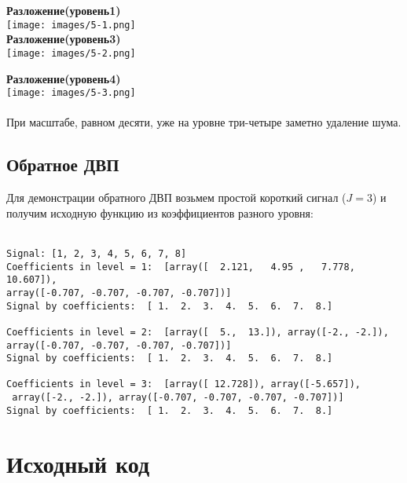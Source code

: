 \documentclass[12pt]{article}
\begin{document}
\textbf{Разложение(уровень1)}\\
\texttt{[image: images/5-1.png]}\\

\textbf{Разложение(уровень3)}\\
\texttt{[image: images/5-2.png]}\\
\newpage

\textbf{Разложение(уровень4)}\\
\texttt{[image: images/5-3.png]}\\
\\
При масштабе, равном десяти, уже на уровне три-четыре заметно удаление шума.

\subsection*{Обратное ДВП}

Для демонстрации обратного ДВП возьмем простой короткий сигнал ($J = 3$) и получим исходную функцию из коэффициентов разного уровня:\\
\\
\begin{lstlisting}
Signal: [1, 2, 3, 4, 5, 6, 7, 8]
Coefficients in level = 1:  [array([  2.121,   4.95 ,   7.778,  10.607]), 
array([-0.707, -0.707, -0.707, -0.707])]
Signal by coefficients:  [ 1.  2.  3.  4.  5.  6.  7.  8.]

Coefficients in level = 2:  [array([  5.,  13.]), array([-2., -2.]), 
array([-0.707, -0.707, -0.707, -0.707])]
Signal by coefficients:  [ 1.  2.  3.  4.  5.  6.  7.  8.]

Coefficients in level = 3:  [array([ 12.728]), array([-5.657]),
 array([-2., -2.]), array([-0.707, -0.707, -0.707, -0.707])]
Signal by coefficients:  [ 1.  2.  3.  4.  5.  6.  7.  8.]

\end{lstlisting}

\section*{Исходный код}


\end{document}
